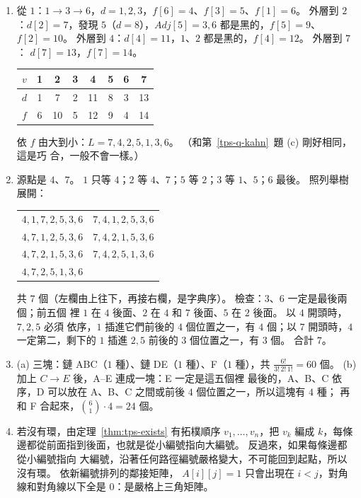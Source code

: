\begin{enumerate}
\item 從 $1$：$1 \to 3 \to 6$，$d = 1, 2, 3$，$f[6] = 4$、$f[3] = 5$、$f[1] = 6$。 外層到
$2$：$d[2] = 7$，發現 $5$（$d = 8$），$\mathit{Adj}[5] = 3, 6$ 都是黑的，$f[5] = 9$、
$f[2] = 10$。 外層到 $4$：$d[4] = 11$，$1$、$2$ 都是黑的，$f[4] = 12$。 外層到 $7$：
$d[7] = 13$，$f[7] = 14$。
\begin{center}
\begin{tabular}{c*{7}{c}}
\toprule
$v$ & 1 & 2 & 3 & 4 & 5 & 6 & 7 \\
\midrule
$d$ & 1 & 7 & 2 & 11 & 8 & 3 & 13 \\
$f$ & 6 & 10 & 5 & 12 & 9 & 4 & 14 \\
\bottomrule
\end{tabular}
\end{center}
依 $f$ 由大到小：$L = 7, 4, 2, 5, 1, 3, 6$。 （和第~\ref{tps-q-kahn}~題 (c) 剛好相同，這是巧
合，一般不會一樣。）

\item 源點是 $4$、$7$。 $1$ 只等 $4$；$2$ 等 $4$、$7$；$5$ 等 $2$；$3$ 等 $1$、$5$；$6$ 最後。
照列舉樹展開：
\begin{center}
\begin{tabular}{ll}
$4, 1, 7, 2, 5, 3, 6$ & $7, 4, 1, 2, 5, 3, 6$ \\
$4, 7, 1, 2, 5, 3, 6$ & $7, 4, 2, 1, 5, 3, 6$ \\
$4, 7, 2, 1, 5, 3, 6$ & $7, 4, 2, 5, 1, 3, 6$ \\
$4, 7, 2, 5, 1, 3, 6$ & \\
\end{tabular}
\end{center}
共 $7$ 個（左欄由上往下，再接右欄，是字典序）。 檢查：$3$、$6$ 一定是最後兩個；前五個
裡 $1$ 在 $4$ 後面、$2$ 在 $4$ 和 $7$ 後面、$5$ 在 $2$ 後面。 以 $4$ 開頭時，$7, 2, 5$ 必須
依序，$1$ 插進它們前後的 $4$ 個位置之一，有 $4$ 個；以 $7$ 開頭時，$4$ 一定第二，剩下的
$1$ 插進 $2, 5$ 前後的 $3$ 個位置之一，有 $3$ 個。 合計 $7$。

\item (a) 三塊：鏈 ABC（$1$ 種）、鏈 DE（$1$ 種）、F（$1$ 種），共
$\frac{6!}{3!\,2!\,1!} = 60$ 個。 (b) 加上 $C \to E$ 後，A--E 連成一塊：E 一定是這五個裡
最後的，A、B、C 依序，D 可以放在 A、B、C 之間或前後 $4$ 個位置之一，所以這塊有 $4$ 種；
再和 F 合起來，$\binom{6}{1} \cdot 4 = 24$ 個。

\item 若沒有環，由定理~\ref{thm:tps-exists} 有拓樸順序 $v_1, \ldots, v_n$，把 $v_k$ 編成
$k$，每條邊都從前面指到後面，也就是從小編號指向大編號。 反過來，如果每條邊都從小編號指向
大編號，沿著任何路徑編號嚴格變大，不可能回到起點，所以沒有環。 依新編號排列的鄰接矩陣，
$A[i][j] = 1$ 只會出現在 $i < j$，對角線和對角線以下全是 $0$：是嚴格上三角矩陣。


\end{enumerate}
